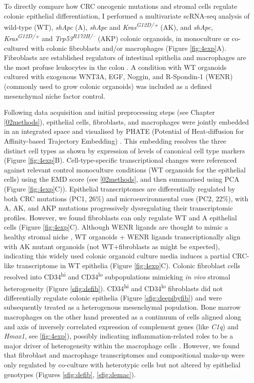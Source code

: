 To directly compare how CRC oncogenic mutations and stromal cells regulate colonic epithelial differentiation, I performed a multivariate scRNA-seq analysis of wild-type (WT), \textit{shApc} (A), \textit{shApc} and \textit{Kras\textsuperscript{G12D/+}} (AK), and \textit{shApc}, \textit{Kras\textsuperscript{G12D/+}} and \textit{Trp53\textsuperscript{R172H/–}} (AKP) colonic organoids, in monoculture or co-cultured with colonic fibroblasts and/or macrophages (Figure \ref{fig:4exp}A). Fibroblasts are established regulators of intestinal epithelia \cite{roulis_fibroblasts_2016} and macrophages are the most profuse leukocytes in the colon \cite{isidro_colonic_2016}. A condition with WT organoids cultured with exogenous WNT3A, EGF, Noggin, and R-Spondin-1 (WENR) (commonly used to grow colonic organoids) was included as a defined mesenchymal niche factor control. 

Following data acquisition and initial preprocessing steps (see Chapter \ref{02methods}), epithelial cells, fibroblasts, and macrophages were jointly embedded in an integrated space and visualised by PHATE (Potential of Heat-diffusion for Affinity-based Trajectory Embedding) \cite{moon_visualizing_2019}. This embedding resolves the three distinct cell types as shown by expression of levels of canonical cell type markers (Figure \ref{fig:4exp}B). 
Cell-type-specific transcriptional changes were referenced against relevant control monoculture conditions (WT organoids for the epithelial cells) using the EMD score (see \ref{02methods}, and then summarised using PCA (Figure \ref{fig:4exp}C)). Epithelial transcriptomes are differentially regulated by both CRC mutations (PC1, 26\%) and microenvironmental cues (PC2, 22\%), with A, AK, and AKP mutations progressively dysregulating their transcriptomic profiles. However, we found fibroblasts can only regulate WT and A epithelial cells (Figure \ref{fig:4exp}C). Although WENR ligands are thought to mimic a healthy stromal niche \cite{mahe_establishment_2013}, WT organoids + WENR ligands transcriptionally align with AK mutant organoids (not WT+fibroblasts as might be expected), indicating this widely used colonic organoid culture media induces a partial CRC-like transcriptome in WT epithelia (Figure \ref{fig:4exp}C).
Colonic fibroblast cells resolved into CD34\textsuperscript{hi} and CD34\textsuperscript{lo} subpopulations mimicking \textit{in vivo} stromal heterogeneity \cite{karpus_colonic_2019} (Figure \ref{sfig:defib}). CD34\textsuperscript{hi} and CD34\textsuperscript{lo} fibroblasts did not differentially regulate colonic epithelia (Figure \ref{sfig:deepibyfib}) and were subsequently treated as a heterogenous mesenchymal population. Bone marrow macrophages on the other hand presented as a continuum of cells aligned along and axis of inversely correlated expression of complement genes (like \emph{C1q}) and \emph{Hmox1}, see \ref{fig:4exp}), possibly indicating inflammation-related roles to be a major driver of heterogeneity within the macrophage cells \cite{naito_heme_2014}. However, we found that fibroblast and macrophage transcriptomes and compositional make-up were only regulated by co-culture with heterotypic cells but not altered by epithelial genotypes (Figures \ref{sfig:defib}, \ref{sfig:demac}). 


